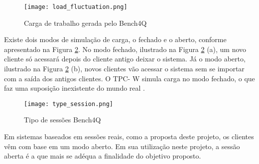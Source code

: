 
\begin{figure}[htb]
	\centering
	\texttt{[image: load\_fluctuation.png]}
	\caption{Carga de trabalho gerada pelo Bench4Q}
	\label{fig:carga-gerada}
\end{figure}


Existe dois modos de simulação de carga, o fechado e o aberto, conforme apresentado na Figura \ref{fig:type-session}. No modo fechado, ilustrado na Figura \ref{fig:type-session} (a), um novo cliente só acessará depois do cliente antigo deixar o sistema. Já o modo aberto, ilustrado na Figura \ref{fig:type-session} (b), novos clientes vão acessar o sistema sem se importar com a saída dos antigos clientes. O TPC- W simula carga no modo fechado, o que faz uma suposição inexistente do mundo real \cite{Bench4Q}. 

\begin{figure}[htb]
	\centering
	\texttt{[image: type\_session.png]}
	\caption{Tipo de sessões Bench4Q}
	\label{fig:type-session}
\end{figure}


Em sistemas baseados em sessões reais, como a proposta deste projeto, os clientes vêm com base em um modo aberto. Em sua utilização neste projeto, a sessão aberta é a que mais se adéqua a finalidade do objetivo proposto.


